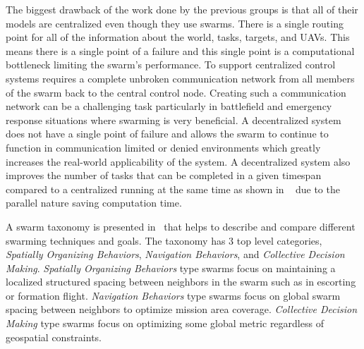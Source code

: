 The biggest drawback of the work done by the previous groups is that all of their models are centralized even though they use swarms.  There is a single routing point for all of the information about the world, tasks, targets, and UAVs.  This means there is a single point of a failure and this single point is a computational bottleneck limiting the swarm's performance.  To support centralized control systems requires a complete unbroken communication network from all members of the swarm back to the central control node.  Creating such a communication network can be a challenging task particularly in battlefield and emergency response situations where swarming is very beneficial.  A decentralized system does not have a single point of failure and allows the swarm to continue to function in communication limited or denied environments which greatly increases the real-world applicability of the system.  A decentralized system also improves the number of tasks that can be completed in a given timespan compared to a centralized running at the same time as shown in ~\citet{chien} due to the parallel nature saving computation time.  

A swarm taxonomy is presented in~\citet{iridia} that helps to describe and compare different swarming techniques and goals. The taxonomy has 3 top level categories, \textit{Spatially Organizing Behaviors}, \textit{Navigation Behaviors}, and \textit{Collective Decision Making}.  \textit{Spatially Organizing Behaviors} type swarms focus on maintaining a localized structured spacing between neighbors in the swarm such as in escorting or formation flight.  \textit{Navigation Behaviors} type swarms focus on global swarm spacing between neighbors to optimize mission area coverage.  \textit{Collective Decision Making} type swarms focus on optimizing some global metric regardless of geospatial constraints.

